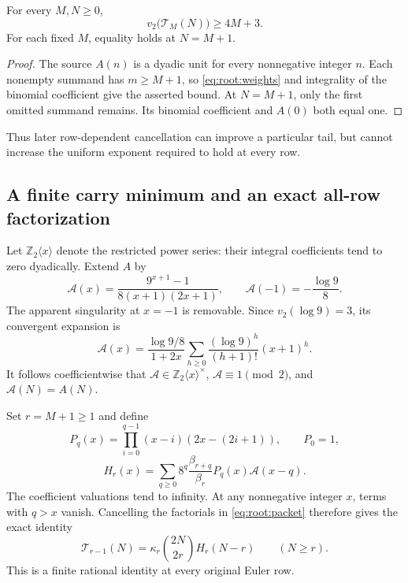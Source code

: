 \begin{proposition}
For every $M,N\ge0$,
\[
 v_2\bigl(\mathcal T_M(N)\bigr)\ge4M+3.
\]
For each fixed $M$, equality holds at $N=M+1$.
\end{proposition}
\begin{proof}
The source $A(n)$ is a dyadic unit for every nonnegative integer $n$.
Each nonempty summand has $m\ge M+1$, so
\eqref{eq:root:weights} and integrality of the binomial coefficient give
the asserted bound. At $N=M+1$, only the first omitted summand remains.
Its binomial coefficient and $A(0)$ both equal one.
\end{proof}

Thus later row-dependent cancellation can improve a particular tail,
but cannot increase the uniform exponent required to hold at every row.

\subsection{A finite carry minimum and an exact all-row factorization}
\label{app:root:factorization}

Let $\mathbb Z_2\langle x\rangle$ denote the restricted power series:
their integral coefficients tend to zero dyadically. Extend $A$ by
\[
 \mathscr A(x)=\frac{9^{x+1}-1}{8(x+1)(2x+1)},
 \qquad \mathscr A(-1)=-\frac{\log9}{8}.
\]
The apparent singularity at $x=-1$ is removable. Since
$v_2(\log9)=3$, its convergent expansion is
\begin{equation}
 \mathscr A(x)=\frac{\log9/8}{1+2x}
   \sum_{h\ge0}\frac{(\log9)^h}{(h+1)!}(x+1)^h.
 \label{eq:root:source}
\end{equation}
It follows coefficientwise that
$\mathscr A\in\mathbb Z_2\langle x\rangle^\times$,
$\mathscr A\equiv1\pmod2$, and $\mathscr A(N)=A(N)$.

Set $r=M+1\ge1$ and define
\[
 P_q(x)=\prod_{i=0}^{q-1}(x-i)(2x-(2i+1)),\qquad P_0=1,
\]
\[
 H_r(x)=\sum_{q\ge0}8^q\frac{\beta_{r+q}}{\beta_r}
                    P_q(x)\mathscr A(x-q).
\]
The coefficient valuations tend to infinity. At any nonnegative integer
$x$, terms with $q>x$ vanish. Cancelling the factorials in
\eqref{eq:root:packet} therefore gives the exact identity
\begin{equation}
 \mathcal T_{r-1}(N)=\kappa_r\binom{2N}{2r}H_r(N-r)
 \qquad(N\ge r).\label{eq:root:factor}
\end{equation}
This is a finite rational identity at every original Euler row.

